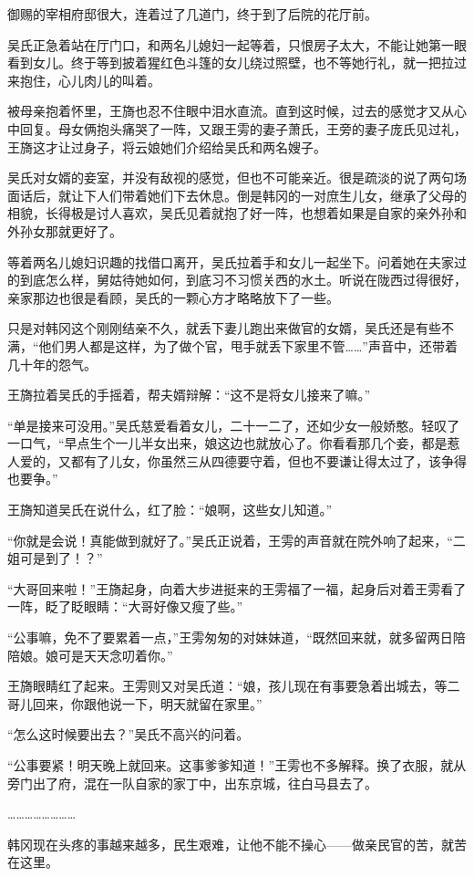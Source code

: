 御赐的宰相府邸很大，连着过了几道门，终于到了后院的花厅前。

吴氏正急着站在厅门口，和两名儿媳妇一起等着，只恨房子太大，不能让她第一眼看到女儿。终于等到披着猩红色斗篷的女儿绕过照壁，也不等她行礼，就一把拉过来抱住，心儿肉儿的叫着。

被母亲抱着怀里，王旖也忍不住眼中泪水直流。直到这时候，过去的感觉才又从心中回复。母女俩抱头痛哭了一阵，又跟王雱的妻子萧氏，王旁的妻子庞氏见过礼，王旖这才让过身子，将云娘她们介绍给吴氏和两名嫂子。

吴氏对女婿的妾室，并没有敌视的感觉，但也不可能亲近。很是疏淡的说了两句场面话后，就让下人们带着她们下去休息。倒是韩冈的一对庶生儿女，继承了父母的相貌，长得极是讨人喜欢，吴氏见着就抱了好一阵，也想着如果是自家的亲外孙和外孙女那就更好了。

等着两名儿媳妇识趣的找借口离开，吴氏拉着手和女儿一起坐下。问着她在夫家过的到底怎么样，舅姑待她如何，到底习不习惯关西的水土。听说在陇西过得很好，亲家那边也很是看顾，吴氏的一颗心方才略略放下了一些。

只是对韩冈这个刚刚结亲不久，就丢下妻儿跑出来做官的女婿，吴氏还是有些不满，“他们男人都是这样，为了做个官，甩手就丢下家里不管……”声音中，还带着几十年的怨气。

王旖拉着吴氏的手摇着，帮夫婿辩解：“这不是将女儿接来了嘛。”

“单是接来可没用。”吴氏慈爱看着女儿，二十一二了，还如少女一般娇憨。轻叹了一口气，“早点生个一儿半女出来，娘这边也就放心了。你看看那几个妾，都是惹人爱的，又都有了儿女，你虽然三从四德要守着，但也不要谦让得太过了，该争得也要争。”

王旖知道吴氏在说什么，红了脸：“娘啊，这些女儿知道。”

“你就是会说！真能做到就好了。”吴氏正说着，王雱的声音就在院外响了起来，“二姐可是到了！？”

“大哥回来啦！”王旖起身，向着大步进挺来的王雱福了一福，起身后对着王雱看了一阵，眨了眨眼睛：“大哥好像又瘦了些。”

“公事嘛，免不了要累着一点，”王雱匆匆的对妹妹道，“既然回来就，就多留两日陪陪娘。娘可是天天念叨着你。”

王旖眼睛红了起来。王雱则又对吴氏道：“娘，孩儿现在有事要急着出城去，等二哥儿回来，你跟他说一下，明天就留在家里。”

“怎么这时候要出去？”吴氏不高兴的问着。

“公事要紧！明天晚上就回来。这事爹爹知道！”王雱也不多解释。换了衣服，就从旁门出了府，混在一队自家的家丁中，出东京城，往白马县去了。

……………………

韩冈现在头疼的事越来越多，民生艰难，让他不能不操心——做亲民官的苦，就苦在这里。

